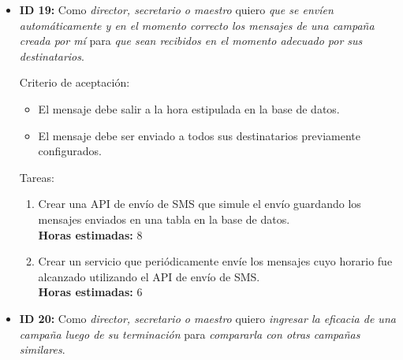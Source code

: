 \documentclass[a4paper, 10pt, twoside]{article}
\newenvironment{stories}{
  \begin{itemize}
}{
  \end{itemize}
}
\newcommand{\storyid}[4]{
  \item
  \textbf{ID #1:} Como \emph{#2} quiero \emph{#3} para \emph{#4}.
}
\newenvironment{tasks}{
  Tareas:
  \begin{enumerate}
}{
  \end{enumerate}
}
\newcommand{\task}[1] {
  \item #1.\\
  \textbf{Horas estimadas:}
}
\newenvironment{criterios}{
  Criterio de aceptación:
  \begin{itemize}
}{
  \end{itemize}
}
\newcommand{\criteria}[1] {
  \item #1
}
\begin{document}
\begin{stories}
   \begin{criterios}
    \criteria{En caso de modificar un mensaje, el formulario debe precargarse con los datos del mensaje original, no se envía si no se completan todos los campos, o si la fecha/hora ingresada es inválida, o si ya hay otro mensaje con la misma fecha/hora ingresada.}
    \criteria{Luego de enviado el formulario, se actualiza el mensaje en la base de datos con la información ingresada en el formulario.}
    \criteria{En caso de eliminar un mensaje, debe ofrecerse una confirmación antes de realizar la operación.}
    \criteria{Luego de finalizada la operación, debe eliminarse el mensaje en la base de datos.}
  \end{criterios}

  \begin{tasks}
    \task{Crear una interfaz que liste todas las campañas creadas por el usuario actual} 3
    \task{Crear interacción que muestre el formulario de edición de la campaña cuando se la selecciona en la lista anterior} 2
    \task{Modificar formulario de edición de campaña y sus componentes para que tenga precargados los datos de una campaña existente y permita modificarla} 0.5
    \task{Modificar código de persistencia de campañas para que permita guardar cambios en una campaña existente} 0.5
  \end{tasks}


  \storyid{19}{director, secretario o maestro}
             {que se envíen automáticamente y en el momento correcto los mensajes de una campaña creada por mí}
             {que sean recibidos en el momento adecuado por sus destinatarios}
  
   \begin{criterios}
  	\criteria{El mensaje debe salir a la hora estipulada en la base de datos.}
    \criteria{El mensaje debe ser enviado a todos sus destinatarios previamente configurados.}
  \end{criterios} 

  \begin{tasks}
    \task{Crear una API de envío de SMS que simule el envío guardando los mensajes enviados en una tabla en la base de datos} 8
    \task{Crear un servicio que periódicamente envíe los mensajes cuyo horario fue alcanzado utilizando el API de envío de SMS} 6
  \end{tasks}


  \storyid{20}{director, secretario o maestro}
             {ingresar la eficacia de una campaña luego de su terminación}
             {compararla con otras campañas similares}
        

\end{stories}
\end{document}
